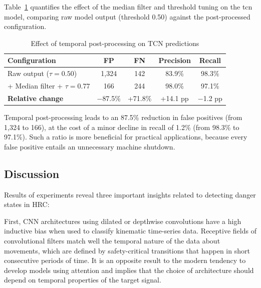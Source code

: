 \documentclass[DTMColor]{ROB-New}
\begin{document}
Table~\ref{tab:postprocess} quantifies the effect of the median filter and threshold tuning on the \ac{tcn} model, comparing raw model output (threshold 0.50) against the post-processed configuration.

\begin{table}
    \centering
    \caption{Effect of temporal post-processing on TCN predictions}
    \label{tab:postprocess}
    \footnotesize
    \begin{tabular*}{\columnwidth}{@{\extracolsep{\fill}}lcccc@{}}
        \toprule
        \textbf{Configuration}          & \textbf{FP} & \textbf{FN} & \textbf{Precision} & \textbf{Recall} \\
        \midrule
        Raw output ($\tau = 0.50$)      & 1,324       & 142         & 83.9\%             & 98.3\%          \\
        + Median filter + $\tau = 0.77$ & 166         & 244         & 98.0\%             & 97.1\%          \\
        \midrule
        \textbf{Relative change}        & $-$87.5\%   & +71.8\%     & +14.1 pp           & $-$1.2 pp       \\
        \bottomrule
    \end{tabular*}
\end{table}

Temporal post-processing leads to an 87.5\% reduction in false positives (from 1,324 to 166), at the cost of a minor decline in recall of 1.2\% (from 98.3\% to 97.1\%). Such a ratio is more beneficial for practical applications, because every false positive entails an unnecessary machine shutdown.

\subsection{Discussion}

Results of experiments reveal three important insights related to detecting danger states in HRC:

First, CNN architectures using dilated or depthwise convolutions have a high inductive bias when used to classify kinematic time-series data. Receptive fields of convolutional filters match well the temporal nature of the data about movements, which are defined by safety-critical transitions that happen in short consecutive periods of time. It is an opposite result to the modern tendency to develop models using attention and implies that the choice of architecture should depend on temporal properties of the target signal.
\end{document}

